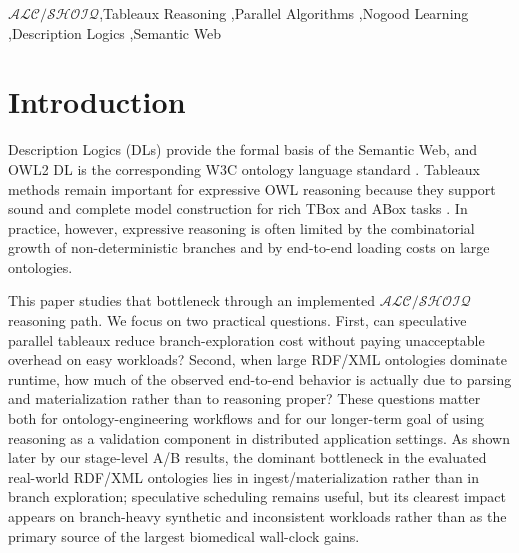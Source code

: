 \documentclass[preprint,12pt,times]{elsarticle}
\newcommand{\dlfrag}{\ensuremath{\mathcal{ALC/SHOIQ}}}
\begin{document}
\begin{frontmatter}
\begin{abstract}
The largest end-to-end gains in the current evaluation come from parser and materialization optimization rather than from speculative reasoning alone. Stage-level A/B runs on DOID, GO-Basic, and UBERON show parse-only reductions of 96.96--97.98\% relative to the previous structural baseline, and a supplementary ChEBI cold-text stress pair shows the same qualitative trend at larger scale. We therefore frame SPACL as a combined systems contribution. Speculative reasoning improves branch-heavy synthetic cases, while structural RDF/XML acceleration dominates the largest real-world wall-clock gains. All head-to-head results are reported as descriptive repeated-run wall-clock comparisons under a fixed harness, not as formal significance tests.
\end{abstract}

\begin{keyword}
\dlfrag \sep Tableaux Reasoning \sep Parallel Algorithms \sep Nogood Learning \sep Description Logics \sep Semantic Web
\end{keyword}

\end{frontmatter}

\section{Introduction}
\label{sec:intro}

Description Logics (DLs) provide the formal basis of the Semantic Web, and OWL2 DL is the corresponding W3C ontology language standard \cite{owl2}. Tableaux methods remain important for expressive OWL reasoning because they support sound and complete model construction for rich TBox and ABox tasks \cite{dlhandbook}. In practice, however, expressive reasoning is often limited by the combinatorial growth of non-deterministic branches and by end-to-end loading costs on large ontologies.

This paper studies that bottleneck through an implemented \dlfrag reasoning path. We focus on two practical questions. First, can speculative parallel tableaux reduce branch-exploration cost without paying unacceptable overhead on easy workloads? Second, when large RDF/XML ontologies dominate runtime, how much of the observed end-to-end behavior is actually due to parsing and materialization rather than to reasoning proper? These questions matter both for ontology-engineering workflows and for our longer-term goal of using reasoning as a validation component in distributed application settings. As shown later by our stage-level A/B results, the dominant bottleneck in the evaluated real-world RDF/XML ontologies lies in ingest/materialization rather than in branch exploration; speculative scheduling remains useful, but its clearest impact appears on branch-heavy synthetic and inconsistent workloads rather than as the primary source of the largest biomedical wall-clock gains.
\end{document}

